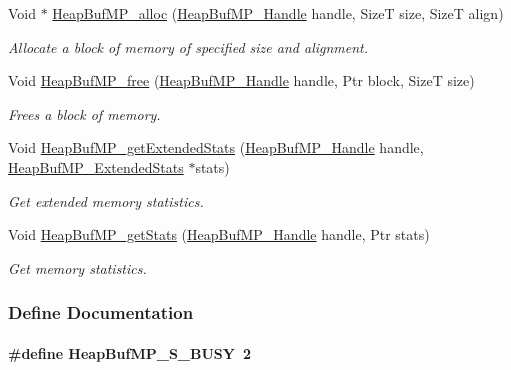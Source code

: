 \begin{DoxyCompactItemize}
Void $\ast$ \hyperlink{_heap_buf_m_p_8h_aab507dc414e09bbfe75ceb78458c27ed}{HeapBufMP\_\-alloc} (\hyperlink{_heap_buf_m_p_8h_a0dc02cca2abd71fa48bfaf79c1c09ca3}{HeapBufMP\_\-Handle} handle, SizeT size, SizeT align)
\begin{DoxyCompactList}\small\item\em Allocate a block of memory of specified size and alignment. \item\end{DoxyCompactList}\item 
Void \hyperlink{_heap_buf_m_p_8h_a667a26b92e70373b8642ff15e61ad7d0}{HeapBufMP\_\-free} (\hyperlink{_heap_buf_m_p_8h_a0dc02cca2abd71fa48bfaf79c1c09ca3}{HeapBufMP\_\-Handle} handle, Ptr block, SizeT size)
\begin{DoxyCompactList}\small\item\em Frees a block of memory. \item\end{DoxyCompactList}\item 
Void \hyperlink{_heap_buf_m_p_8h_a339d8eb929f35742d2ff5b3b5381c57b}{HeapBufMP\_\-getExtendedStats} (\hyperlink{_heap_buf_m_p_8h_a0dc02cca2abd71fa48bfaf79c1c09ca3}{HeapBufMP\_\-Handle} handle, \hyperlink{struct_heap_buf_m_p___extended_stats}{HeapBufMP\_\-ExtendedStats} $\ast$stats)
\begin{DoxyCompactList}\small\item\em Get extended memory statistics. \item\end{DoxyCompactList}\item 
Void \hyperlink{_heap_buf_m_p_8h_aed941f6bb592ec1573c646f7c6a4290a}{HeapBufMP\_\-getStats} (\hyperlink{_heap_buf_m_p_8h_a0dc02cca2abd71fa48bfaf79c1c09ca3}{HeapBufMP\_\-Handle} handle, Ptr stats)
\begin{DoxyCompactList}\small\item\em Get memory statistics. \item\end{DoxyCompactList}\end{DoxyCompactItemize}


\subsubsection{Define Documentation}
\paragraph[{HeapBufMP\_\-S\_\-BUSY}]{\setlength{\rightskip}{0pt plus 5cm}\#define HeapBufMP\_\-S\_\-BUSY~2}\hfill\label{_heap_buf_m_p_8h_ae1b0ea5865b0687653171ad2bf3d17b3}


